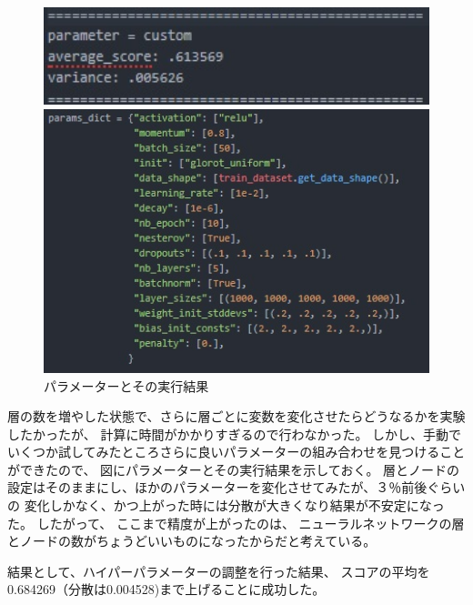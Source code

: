 \documentclass[a4j,11pt]{jarticle}
\begin{document}
\begin{figure}
	\begin{minipage}{0.50\hsize}
		\begin{center}
			\includegraphics[width=12cm, bb=0 0 292 74]{optimal1.jpg}
		\end{center}
	\end{minipage}
	\begin{minipage}{0.50\hsize}
		\begin{center}
			\includegraphics[width=12cm, bb=0 0 411 281]{optimal1p.jpg}
		\end{center}
	\end{minipage}
	\caption{パラメーターとその実行結果}
	\label{fig2}
\end{figure}



層の数を増やした状態で、さらに層ごとに変数を変化させたらどうなるかを実験したかったが、
計算に時間がかかりすぎるので行わなかった。
しかし、手動でいくつか試してみたところさらに良いパラメーターの組み合わせを見つけることができたので、
図\label{optimal2}にパラメーターとその実行結果を示しておく。
層とノードの設定はそのままにし、ほかのパラメーターを変化させてみたが、３％前後ぐらいの
変化しかなく、かつ上がった時には分散が大きくなり結果が不安定になった。
したがって、
ここまで精度が上がったのは、
ニューラルネットワークの層とノードの数がちょうどいいものになったからだと考えている。

結果として、ハイパーパラメーターの調整を行った結果、
スコアの平均を0.684269（分散は0.004528)まで上げることに成功した。
\end{document}
